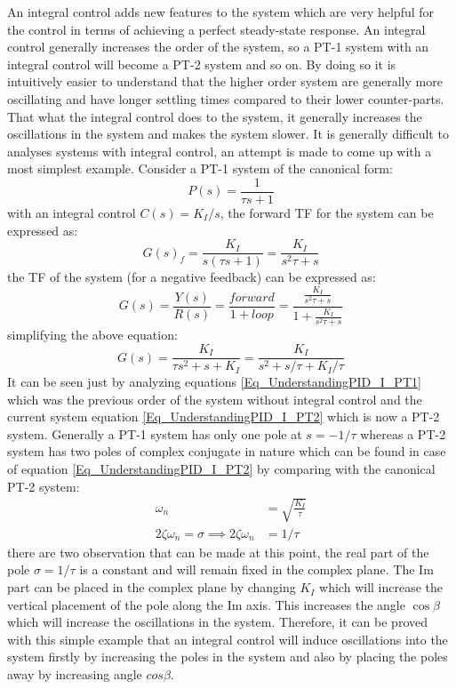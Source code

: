 An integral control adds new features to the system which are very helpful for the control in terms of achieving a perfect steady-state response. An integral control generally increases the order of the system, so a PT-1 system with an integral control will become a PT-2 system and so on. By doing so it is intuitively easier to understand that the higher order system are generally more oscillating and have longer settling times compared to their lower counter-parts. That what the integral control does to the system, it generally increases the oscillations in the system and makes the system slower. It is generally difficult to analyses systems with integral control, an attempt is made to come up with a most simplest example. Consider a PT-1 system of the canonical form:
\begin{equation} \label{Eq_UnderstandingPID_I_PT1}
	P(s) = \frac{1}{\tau s + 1}
\end{equation}
with an integral control $C(s) = K_I / s$, the forward TF for the system can be expressed as:
\begin{equation}
	G(s)_{f} = \frac{K_I}{s(\tau s + 1)} = \frac{K_I}{s^2 \tau + s}
\end{equation}
the TF of the system (for a negative feedback) can be expressed as:
\begin{equation}
	G(s) = \frac{Y(s)}{R(s)} = \frac{forward}{1 + loop} = \frac{\frac{K_I}{s^2 \tau + s}}{1 + \frac{K_I}{s^2 \tau + s}}
\end{equation}
simplifying the above equation:
\begin{equation} \label{Eq_UnderstandingPID_I_PT2}
	G(s) = \frac{K_I}{\tau s^2 + s + K_I} = \frac{K_I}{ s^2 + s / \tau + K_I / \tau}
\end{equation}
It can be seen just by analyzing equations \eqref{Eq_UnderstandingPID_I_PT1} which was the previous order of the system without integral control and the current system equation \eqref{Eq_UnderstandingPID_I_PT2} which is now a PT-2 system. Generally a PT-1 system has only one pole at $s = -1 / \tau$ whereas a PT-2 system has two poles of complex conjugate in nature which can be found in case of equation \eqref{Eq_UnderstandingPID_I_PT2} by comparing with the canonical PT-2 system:
\begin{align}
	\omega_{n} &= \sqrt{\frac{K_I}{\tau}} \\
	2 \zeta \omega_{n} = \sigma \implies 2 \zeta \omega_{n} &= 1 / \tau
\end{align}
there are two observation that can be made at this point, the real part of the pole $\sigma = 1 / \tau$ is a constant and will remain fixed in the complex plane. The Im part can be placed in the complex plane by changing $K_I$ which will increase the vertical placement of the pole along the Im axis. This increases the angle $\cos{\beta}$ which will increase the oscillations in the system. Therefore, it can be proved with this simple example that an integral control will induce oscillations into the system firstly by increasing the poles in the system and also by placing the poles away by increasing angle $cos{\beta}$.

